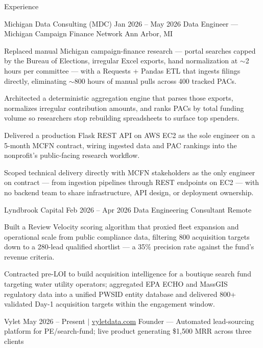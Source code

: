 \documentclass[
	11pt
]{../../../template}
\begin{document}
	\begin{rSection}{E}{xperience}
		\begin{rSectionEntry}
			{Michigan Data Consulting (MDC)}
			{Jan 2026 -- May 2026}
			{Data Engineer --- Michigan Campaign Finance Network}
			{}
			{Ann Arbor, MI}

			\item Replaced manual Michigan campaign-finance research --- portal searches capped by the Bureau of Elections, irregular Excel exports, hand normalization at $\sim$2 hours per committee --- with a Requests + Pandas ETL that ingests filings directly, eliminating $\sim$800 hours of manual pulls across 400 tracked PACs.
			\item Architected a deterministic aggregation engine that parses those exports, normalizes irregular contribution amounts, and ranks PACs by total funding volume so researchers stop rebuilding spreadsheets to surface top spenders.
			\item Delivered a production Flask REST API on AWS EC2 as the sole engineer on a 5-month MCFN contract, wiring ingested data and PAC rankings into the nonprofit's public-facing research workflow.
			\item Scoped technical delivery directly with MCFN stakeholders as the only engineer on contract --- from ingestion pipelines through REST endpoints on EC2 --- with no backend team to share infrastructure, API design, or deployment ownership.
		\end{rSectionEntry}

		\begin{rSectionEntry}
			{Lyndbrook Capital}
			{Feb 2026 -- Apr 2026}
			{Data Engineering Consultant}
			{}
			{Remote}

			\item Built a Review Velocity scoring algorithm that proxied fleet expansion and operational scale from public compliance data, filtering 800 acquisition targets down to a 280-lead qualified shortlist --- a 35\% precision rate against the fund's revenue criteria.
			\item Contracted pre-LOI to build acquisition intelligence for a boutique search fund targeting water utility operators; aggregated EPA ECHO and MassGIS regulatory data into a unified PWSID entity database and delivered 800+ validated Day-1 acquisition targets within the engagement window.
		\end{rSectionEntry}

		\begin{rSectionEntry}
			{Vylet}
			{May 2026 -- Present $\vert$ \href{https://vyletdata.com}{vyletdata.com}}
			{Founder --- Automated lead-sourcing platform for PE/search-fund; live product generating \$1,500 MRR across three clients}
			{}
			{}


\end{rSectionEntry}
\end{rSection}
\end{document}
